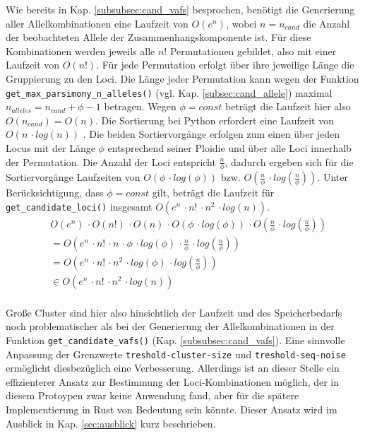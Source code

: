 Wie bereits in Kap. \ref{subsubsec:cand_vafs} besprochen, benötigt die Generierung aller Allelkombinationen eine Laufzeit von $ O(e^n) $, wobei $n = n_{cand}$ die Anzahl der beobachteten Allele der Zusammenhangskomponente ist. Für diese Kombinationen werden jeweils alle $n!$ Permutationen gebildet, also mit einer Laufzeit von $ O(n!) $. Für jede Permutation erfolgt über ihre jeweilige Länge die Gruppierung zu den Loci. Die Länge jeder Permutation kann wegen der Funktion \lstinline|get_max_parsimony_n_alleles()| (vgl. Kap. \ref{subsec:cand_allele}) maximal $ n_{alleles} = n_{cand} + \phi - 1 $ betragen. Wegen $\phi = const$ beträgt die Laufzeit hier also $O(n_{cand}) = O(n)$. Die Sortierung bei Python erfordert eine Laufzeit von $ O(n\, \cdotp log(n))$ \cite{python-sort}. Die beiden Sortiervorgänge erfolgen zum einen über jeden Locus mit der Länge $\phi$ entsprechend seiner Ploidie und über alle Loci innerhalb der Permutation. Die Anzahl der Loci entspricht $\frac{n}{\phi}$, dadurch ergeben sich für die Sortiervorgänge Laufzeiten von $ O(\phi\, \cdotp log(\phi)) $ bzw. $ O\left( \frac{n}{\phi}\, \cdotp log\left( \frac{n}{\phi}\right) \right) $. Unter Berücksichtigung, dass $\phi = const$ gilt, beträgt die Laufzeit für \lstinline|get_candidate_loci()| insgesamt $ O(e^n \, \cdotp n! \, \cdotp n^2 \, \cdotp log(n)) $.
\begin{equation} \label{eqn:3-29}
\tag{3-29}
\begin{aligned}
&\ {}O(e^n) \, \cdotp O(n!) \, \cdotp O(n) \, \cdotp O(\phi\, \cdotp log(\phi))\, \cdotp O\left( \frac{n}{\phi}\, \cdotp log\left( \frac{n}{\phi}\right) \right)  \\
&\ =O\left( e^n \, \cdotp n! \, \cdotp n\, \cdotp \phi\, \cdotp log(\phi)\, \cdotp  \frac{n}{\phi}\, \cdotp log\left( \frac{n}{\phi} \right)\right)   \\
&\ =O\left( e^n \, \cdotp n! \, \cdotp n^2 \, \cdotp log(\phi)\, \cdotp  log\left( \frac{n}{\phi} \right)\right)   \\
&\ \in O(e^n \, \cdotp n! \, \cdotp n^2 \, \cdotp log(n))
\end{aligned}
\end{equation}
\\
Große Cluster sind hier also hinsichtlich der Laufzeit und des Speicherbedarfs noch problematischer als bei der Generierung der Allelkombinationen in der Funktion \linebreak \lstinline|get_candidate_vafs()| (Kap. \ref{subsubsec:cand_vafs}). Eine sinnvolle Anpassung der Grenzwerte \linebreak \lstinline|treshold-cluster-size| und   \lstinline|treshold-seq-noise| ermöglicht diesbezüglich eine Verbesserung. Allerdings ist an dieser Stelle ein effizienterer Ansatz zur Bestimmung der Loci-Kombinationen möglich, der in diesem Protoypen zwar keine Anwendung fand, aber für die spätere Implementierung in Rust von Bedeutung sein könnte. Dieser Ansatz wird im Ausblick in Kap. \ref{sec:ausblick} kurz beschrieben.

